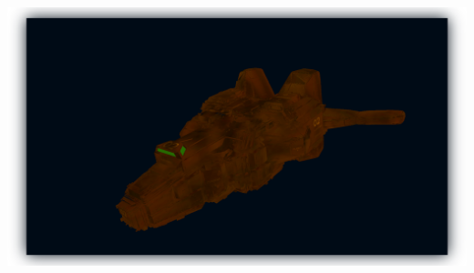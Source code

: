 \documentclass[final,hyperref={pdfpagelabels=true}]{beamer}
\newenvironment{postit}
{\begin{beamercolorbox}[sep=1em,wd=7cm]{postit}}
{\end{beamercolorbox}}
\begin{document}
\begin{frame}[fragile]
\begin{columns}[t]
\begin{column}{.45\textwidth}
			\includegraphics[width=369.5mm]{images/PURGE.png}

		\end{column}
	\end{columns}

  
\end{frame}
\end{document}
